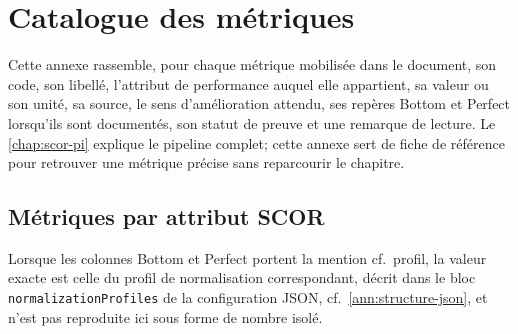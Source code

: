 \chapter{Catalogue des métriques}
\label{ann:metriques}

Cette annexe rassemble, pour chaque métrique mobilisée dans le document, son code, son libellé, l'attribut de performance auquel elle appartient, sa valeur ou son unité, sa source, le sens d'amélioration attendu, ses repères Bottom et Perfect lorsqu'ils sont documentés, son statut de preuve et une remarque de lecture. Le \cref{chap:scor-pi} explique le pipeline complet; cette annexe sert de fiche de référence pour retrouver une métrique précise sans reparcourir le chapitre.


\section{Métriques par attribut SCOR}

Lorsque les colonnes Bottom et Perfect portent la mention \og cf.~profil\fg{}, la valeur exacte est celle du profil de normalisation correspondant, décrit dans le bloc \texttt{normalizationProfiles} de la configuration JSON, cf.~\cref{ann:structure-json}, et n'est pas reproduite ici sous forme de nombre isolé.


